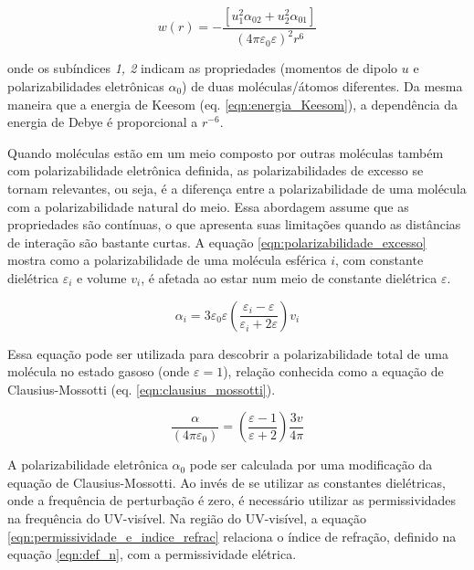 	\begin{equation}
		w ( r ) = - \frac { \left[ u _ { 1 } ^ { 2 } \alpha _ { 02 } + u _ { 2 } ^ { 2 } \alpha _ { 01 } \right] } { \left( 4 \pi \varepsilon _ { 0 } \varepsilon \right) ^ { 2 } r ^ { 6 } }
		\label{eqn:energia_Debye}
	\end{equation}
	
	\noindent onde os subíndices \emph{1, 2} indicam as propriedades (momentos de dipolo \(u\) e polarizabilidades eletrônicas \(\alpha_0\)) de duas moléculas/átomos diferentes. Da mesma maneira que a energia de Keesom (eq. \ref{eqn:energia_Keesom}), a dependência da energia de Debye é proporcional a \(r^{-6}\).
	
	Quando moléculas estão em um meio composto por outras moléculas também com polarizabilidade eletrônica definida, as polarizabilidades de excesso se tornam relevantes, ou seja, é a diferença entre a polarizabilidade de uma molécula com a polarizabilidade natural do meio. Essa abordagem assume que as propriedades são contínuas, o que apresenta suas limitações quando as distâncias de interação são bastante curtas. A equação \ref{eqn:polarizabilidade_excesso} mostra como a polarizabilidade de uma molécula esférica \(i\), com constante dielétrica \(\varepsilon_i\) e volume \(v_i\), é afetada ao estar num meio de constante dielétrica \(\varepsilon\).
	
	\begin{equation}
		\alpha_i = 3 \varepsilon_{ 0 } \varepsilon \left( \dfrac{\varepsilon_i - \varepsilon}{\varepsilon_i + 2 \varepsilon}  \right) v_i
		\label{eqn:polarizabilidade_excesso}
	\end{equation}
	 
	 Essa equação pode ser utilizada para descobrir a polarizabilidade total de uma molécula no estado gasoso (onde \(\varepsilon = 1\)), relação conhecida como a equação de Clausius-Mossotti (eq. \ref{eqn:clausius_mossotti}).
	 
	 \begin{equation}
		\dfrac { \alpha } { \left( 4 \pi \varepsilon _ { 0 } \right) } = \left( \dfrac { \varepsilon - 1 } { \varepsilon + 2 } \right) \dfrac { 3 v } { 4 \pi }
		\label{eqn:clausius_mossotti}
	 \end{equation}
	
	A polarizabilidade eletrônica \(\alpha_0\) pode ser calculada por uma modificação da equação de Clausius-Mossotti. Ao invés de se utilizar as constantes dielétricas, onde a frequência de perturbação é zero, é necessário utilizar as permissividades na frequência do UV-visível. Na região do UV-visível, a equação \ref{eqn:permissividade_e_indice_refrac} relaciona o índice de refração, definido na equação \ref{eqn:def_n}, com a permissividade elétrica.
	
